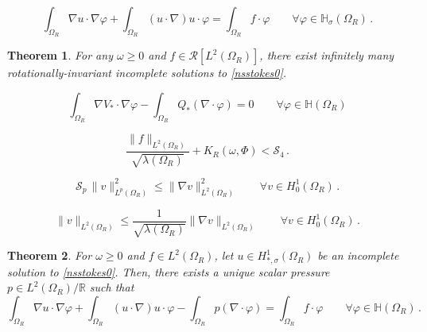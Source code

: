 \documentclass[10pt,a4paper]{amsart}
\newtheorem{theorem}{Theorem}
\begin{document}
\begin{equation} \label{nstokesdebilstar}
\int_{\Omega_{R}} \nabla u \cdot \nabla \varphi + \int_{\Omega_{R}} (u \cdot \nabla) u \cdot \varphi  = \int_{\Omega_{R}} f \cdot \varphi \qquad
\forall \varphi \in \mathbb{H}_{\sigma}(\Omega_{R})\, .
\end{equation}

\begin{theorem} \label{nonuniquetheomain}
For any $\omega \geq 0$ and $f \in \mathcal{R}[L^{2}(\Omega_{R})]$, there exist infinitely many rotationally-invariant incomplete solutions to
\eqref{nsstokes0}.
\end{theorem}

\begin{equation}\label{lambdastarwf}
\int_{\Omega_R}\nabla V_{*}\cdot\nabla\varphi-\int_{\Omega_{R}}Q_{*}(\nabla\cdot\varphi)=0\qquad\forall\varphi\in
\mathbb{H}(\Omega_R)
\end{equation}

\begin{equation} \label{umbral1cor3}
\dfrac{\|f\|_{L^2(\Omega_{R})}}{\sqrt{\lambda(\Omega_{R})}} + K_{R}(\omega, \Phi) < \mathcal{S}_4  \, .
\end{equation}

\begin{equation} \label{sobolevconstants11}
\mathcal{S}_{p} \, \|v\|^{2}_{L^{p}(\Omega_{R})} \leq \|\nabla v\|^2_{L^2(\Omega_{R})} \qquad \forall v \in H_0^{1}(\Omega_{R}) \, .
\end{equation}

\begin{equation} \label{sobpoin}
\|v\|_{L^{2}(\Omega_{R})} \leq \dfrac{1}{\sqrt{\lambda(\Omega_{R})}} \|\nabla v\|_{L^2(\Omega_{R})} \qquad \forall v \in H_0^{1}(\Omega_{R}) \, .
\end{equation}

\begin{theorem} \label{incompletepressure}
For $\omega\ge0$ and $f \in L^2(\Omega_R)$, let $u \in H^{1}_{*,\sigma}(\Omega_{R})$ be an incomplete solution to \eqref{nsstokes0}.
Then, there exists a unique scalar pressure $p \in L^{2}(\Omega_{R})/\mathbb{R}$ such that
\begin{equation} \label{nstokesdebilstarpres}
\int_{\Omega_{R}} \nabla u \cdot \nabla \varphi + \int_{\Omega_{R}} (u \cdot \nabla) u \cdot \varphi  - \int_{\Omega_{R}} p (\nabla \cdot \varphi)
= \int_{\Omega_{R}} f \cdot \varphi \qquad \forall \varphi \in \mathbb{H}(\Omega_{R}) \, .
\end{equation}
\end{theorem}
\end{document}
